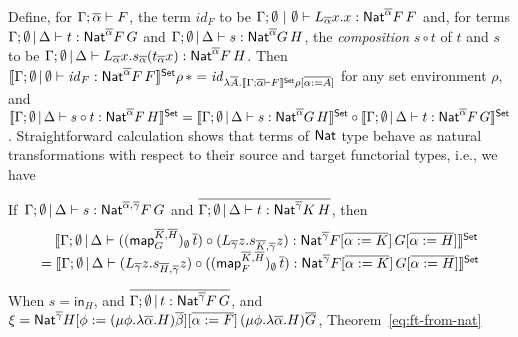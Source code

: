\documentclass[runningheads]{llncs}
\renewcommand{\id}{\mathit{id}}
\newcommand{\map}{\mathsf{map}}
\renewcommand{\id}{\mathit{id}}
\begin{document}
Define, for $\Gamma; \overline{\alpha} \vdash F$, the term $\id_F$ to be
$\Gamma;\emptyset~|~\emptyset \vdash L_{\overline{\alpha}}x.x :
\mathsf{Nat}^{\overline{\alpha}} F\,F$ and, for terms $\Gamma; \emptyset \,|\,
\Delta \vdash t: \mathsf{Nat}^{\overline{\alpha}} F\,G$ and $\Gamma; \emptyset
\,|\, \Delta \vdash s: \mathsf{Nat}^{\overline{\alpha}} G\,H$, the {\em
  composition} $s \circ t$ of $t$ and $s$ to be $\Gamma;
\emptyset\,|\, \Delta \vdash L_{\overline{\alpha}}
x. s_{\overline{\alpha}}(t_{\overline{\alpha}}x):
\mathsf{Nat}^{\overline{\alpha}} F\,H$. Then $\setsem{\Gamma; \emptyset \,|\,
  \emptyset \vdash \id_{F} : \Nat^{\ol{\alpha}} F\,F} \rho\, \ast =
\id_{\lambda \ol{A}. \setsem{\Gamma; \ol{\alpha} \vdash F} \rho
  [\ol{\alpha := A}]}$ for any set environment $\rho$, and
$\llbracket{\Gamma; \emptyset \,|\, \Delta \vdash s \circ t:
  \mathsf{Nat}^{\overline{\alpha}} F\,H}\rrbracket^{\mathsf{Set}} = \llbracket{\Gamma; \emptyset \,|\,
  \Delta \vdash s: \mathsf{Nat}^{\overline{\alpha}} G\,H}\rrbracket^{\mathsf{Set}} \circ
\llbracket{\Gamma; \emptyset \,|\, \Delta \vdash t:
  \mathsf{Nat}^{\overline{\alpha}} F\,G}\rrbracket^{\mathsf{Set}}$. Straightforward calculation shows
that terms of $\mathsf{Nat}$ type behave as natural transformations with
respect to their source and target functorial types, i.e., we have
\begin{theorem}\label{eq:ft-from-nat} 
  If\, $\Gamma; \emptyset \,|\, \Delta \vdash s : \mathsf{Nat}^{\overline{\alpha},
  \overline{\gamma}} F\,G$ and $\overline{\Gamma; \emptyset \,|\,
  \Delta \vdash t : \mathsf{Nat}^{\overline{\gamma}} K\, H}$, then
  \[\begin{array}{l}
  \hspace*{0.135in}
\setsem{\Gamma; \emptyset\,|\, \Delta
  \vdash 
  ((\map_G^{\overline{K}, \overline{H}})_\emptyset \,\overline{t}) \circ
(L_{\overline{\gamma}} z. s_{\overline{K}, \overline{\gamma}}
  z)
  : \Nat^{\overline{\gamma}} F[\overline{\alpha := K}]\,
  G[\overline{\alpha := H}]}\\
= \setsem{ \Gamma; \emptyset \,|\, \Delta \vdash
(L_{\overline{\gamma}} z.
  s_{\overline{H}, \overline{\gamma}} z)\circ
  ((\map_F^{\overline{K}, \overline{H}})_\emptyset \,
  \overline{t})  : \Nat^{\overline{\gamma}} F[\overline{\alpha :=
      K}]\, G[\overline{\alpha := H}]}
\end{array}\]
\end{theorem}
\noindent
When $s = \mathsf{in}_H$, and
$\overline{\Gamma; \emptyset \,|\, t :
 \mathsf{Nat}^{\overline{\gamma}} F\, G}$,
and $\xi = \mathsf{Nat}^{\overline{\gamma}} H[\phi :=
  (\mu \phi. \lambda \overline{\alpha}. H)
  \overline{\beta}][\overline{\alpha := F}]\, (\mu \phi. \lambda
\overline{\alpha}. H)\overline{G}$, Theorem~\ref{eq:ft-from-nat}
\end{document}
